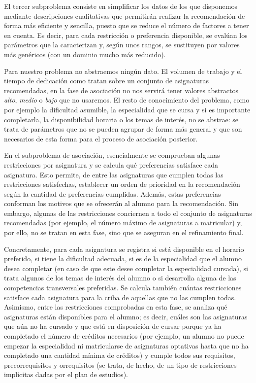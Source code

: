 El tercer subproblema consiste en simplificar los datos de los que disponemos 
mediante descripciones cualitativas que permitirán realizar la recomendación 
de forma más eficiente y sencilla, puesto que se reduce el número de factores 
a tener en cuenta. Es decir, para cada restricción o preferencia disponible, 
se evalúan los parámetros que la caracterizan y, según unos rangos, se 
sustituyen por valores más genéricos (con un dominio mucho más reducido). 

Para nuestro problema no abstraemos ningún dato. El volumen de trabajo y el tiempo 
de dedicación como tratan sobre un conjunto de asignaturas recomendadas, en la fase 
de asociación no nos servirá tener valores abstractos \textit{alto}, \textit{medio} 
o \textit{bajo} que no usaremos. El resto de conocimiento del problema, como por ejemplo 
la dificultad asumible, la especialidad que se cursa y si es importante completarla, 
la disponibilidad horaria o los temas de interés, no se abstrae: se trata de parámetros 
que no se pueden agrupar de forma más general y que son necesarios de esta forma para 
el proceso de asociación posterior.

En el subproblema de asociación, esencialmente se comprueban algunas 
restricciones por asignatura y se calcula qué preferencias satisface cada 
asignatura. Esto permite, de entre las asignaturas que cumplen todas las 
restricciones satisfechas, establecer un orden de prioridad en la 
recomendación según la cantidad de preferencias cumplidas. Además, estas 
preferencias conforman los motivos que se ofrecerán al alumno para la 
recomendación. Sin embargo, algunas de las restricciones conciernen a todo 
el conjunto de asignaturas recomendadas (por ejemplo, el número máximo de 
asignaturas a matricular) y, por ello, no se tratan en esta fase, sino que 
se aseguran en el refinamiento final.

Concretamente, para cada asignatura se registra si está disponible en el 
horario preferido, si tiene la dificultad adecuada, si es de la especialidad 
que el alumno desea completar (en caso de que este desee completar la 
especialidad cursada), si trata algunos de los temas de interés del alumno 
o si desarrolla alguna de las competencias transversales preferidas. Se 
calcula también cuántas restricciones satisface cada asignatura para la criba 
de aquellas que no las cumplen todas. Asimismo, entre las restricciones 
comprobadas en esta fase, se analiza qué asignaturas están disponibles para 
el alumno; es decir, cuáles son las asignaturas que aún no ha cursado y 
que está en disposición de cursar porque ya ha completado el número de 
créditos necesarios (por ejemplo, un alumno no puede empezar la especialidad 
ni matricularse de asignaturas optativas hasta que no ha completado una 
cantidad mínima de créditos) y cumple todos sus requisitos, precorrequisitos 
y orrequisitos (se trata, de hecho, de un tipo de restricciones implícitas 
dadas por el plan de estudios).

